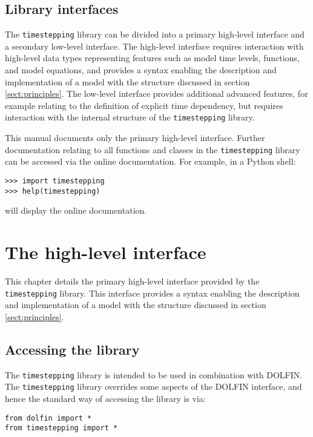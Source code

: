\documentclass[a4paper]{book}
\begin{document}
\section{Library interfaces}

The \verb+timestepping+ library can be divided into a primary high-level
interface and a secondary low-level interface. The high-level interface requires
interaction with high-level data types representing features such as model time
levels, functions, and model equations, and provides a syntax enabling the
description and implementation of a model with the structure discussed in
section \ref{sect:principles}. The low-level interface provides additional
advanced features, for example relating to the definition of explicit time
dependency, but requires interaction with the internal structure of the
\verb+timestepping+ library.

This manual documents only the primary high-level interface. Further
documentation relating to all functions and classes in the \verb+timestepping+
library can be accessed via the online documentation. For example, in a Python
shell:
\begin{lstlisting}
>>> import timestepping
>>> help(timestepping)
\end{lstlisting}
will display the online documentation.

\chapter{The high-level interface}

This chapter details the primary high-level interface provided by the \linebreak
\verb+timestepping+ library. This interface provides a syntax enabling the
description and implementation of a model with the structure discussed in
section \ref{sect:principles}.

\section{Accessing the library}

The \verb+timestepping+ library is intended to be used in combination with
DOLFIN. The \verb+timestepping+ library overrides some aspects of the DOLFIN
interface, and hence the standard way of accessing the library is via:
\begin{lstlisting}
from dolfin import *
from timestepping import *
\end{lstlisting}
\end{document}
